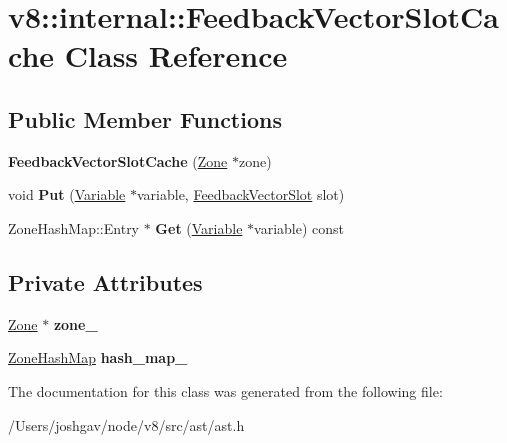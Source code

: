 \hypertarget{classv8_1_1internal_1_1_feedback_vector_slot_cache}{}\section{v8\+:\+:internal\+:\+:Feedback\+Vector\+Slot\+Cache Class Reference}
\label{classv8_1_1internal_1_1_feedback_vector_slot_cache}
\subsection*{Public Member Functions}
\begin{DoxyCompactItemize}
\item 
{\bfseries Feedback\+Vector\+Slot\+Cache} (\hyperlink{classv8_1_1internal_1_1_zone}{Zone} $\ast$zone)\hypertarget{classv8_1_1internal_1_1_feedback_vector_slot_cache_abc30102085dde71ad1b062b2a48c1f66}{}\label{classv8_1_1internal_1_1_feedback_vector_slot_cache_abc30102085dde71ad1b062b2a48c1f66}

\item 
void {\bfseries Put} (\hyperlink{classv8_1_1internal_1_1_variable}{Variable} $\ast$variable, \hyperlink{classv8_1_1internal_1_1_feedback_vector_slot}{Feedback\+Vector\+Slot} slot)\hypertarget{classv8_1_1internal_1_1_feedback_vector_slot_cache_a91548506954fbf961884466ab4ee3796}{}\label{classv8_1_1internal_1_1_feedback_vector_slot_cache_a91548506954fbf961884466ab4ee3796}

\item 
Zone\+Hash\+Map\+::\+Entry $\ast$ {\bfseries Get} (\hyperlink{classv8_1_1internal_1_1_variable}{Variable} $\ast$variable) const \hypertarget{classv8_1_1internal_1_1_feedback_vector_slot_cache_aface8949e7fba5390f77fdf937ea89bc}{}\label{classv8_1_1internal_1_1_feedback_vector_slot_cache_aface8949e7fba5390f77fdf937ea89bc}

\end{DoxyCompactItemize}
\subsection*{Private Attributes}
\begin{DoxyCompactItemize}
\item 
\hyperlink{classv8_1_1internal_1_1_zone}{Zone} $\ast$ {\bfseries zone\+\_\+}\hypertarget{classv8_1_1internal_1_1_feedback_vector_slot_cache_ad2ce7ea22a859e886c2a270a01ae2d4e}{}\label{classv8_1_1internal_1_1_feedback_vector_slot_cache_ad2ce7ea22a859e886c2a270a01ae2d4e}

\item 
\hyperlink{classv8_1_1internal_1_1_template_hash_map_impl}{Zone\+Hash\+Map} {\bfseries hash\+\_\+map\+\_\+}\hypertarget{classv8_1_1internal_1_1_feedback_vector_slot_cache_a41182796d2492ff3998feb2a52458c04}{}\label{classv8_1_1internal_1_1_feedback_vector_slot_cache_a41182796d2492ff3998feb2a52458c04}

\end{DoxyCompactItemize}


The documentation for this class was generated from the following file\+:\begin{DoxyCompactItemize}
\item 
/\+Users/joshgav/node/v8/src/ast/ast.\+h\end{DoxyCompactItemize}

